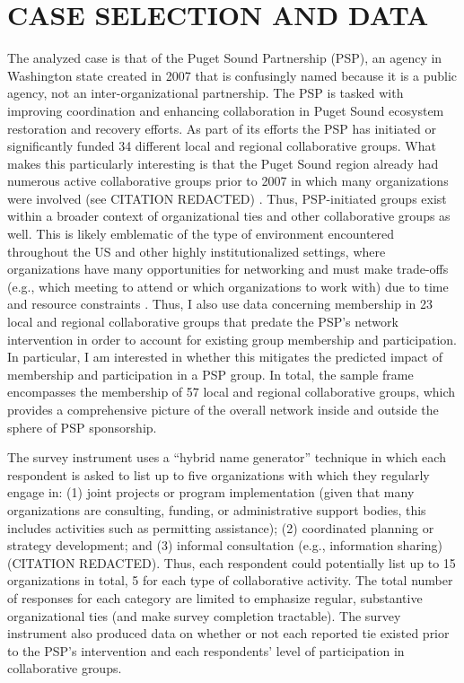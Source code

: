 \documentclass[12pt,a4paper,titlepage]{article}
\begin{document}
\section{\bf\MakeUppercase{Case Selection and Data}}

The analyzed case is that of the Puget Sound Partnership (PSP), an agency in Washington state created in 2007 that is confusingly named because it is a public agency, not an inter-organizational partnership. The PSP is tasked with improving coordination and enhancing collaboration in Puget Sound ecosystem restoration and recovery efforts. As part of its efforts the PSP has initiated or significantly funded 34 different local and regional collaborative groups. What makes this particularly interesting is that the Puget Sound region already had numerous active collaborative groups prior to 2007 in which many organizations were involved (see CITATION REDACTED) . Thus, PSP-initiated groups exist within a broader context of organizational ties and other collaborative groups as well. This is likely emblematic of the type of environment encountered throughout the US and other highly institutionalized settings, where organizations have many opportunities for networking and must make trade-offs (e.g., which meeting to attend or which organizations to work with) due to time and resource constraints \parencite{lubell2010}. Thus, I also use data concerning membership in 23 local and regional collaborative groups that predate the PSP’s network intervention in order to account for existing group membership and participation. In particular, I am interested in whether this mitigates the predicted impact of membership and participation in a PSP group. In total, the sample frame encompasses the membership of 57 local and regional collaborative groups, which provides a comprehensive picture of the overall network inside and outside the sphere of PSP sponsorship.

The survey instrument uses a “hybrid name generator” technique \parencite{henry2012,lubell2011-a} in which each respondent is asked to list up to five organizations with which they regularly engage in: (1) joint projects or program implementation (given that many organizations are consulting, funding, or administrative support bodies, this includes activities such as permitting assistance); (2) coordinated planning or strategy development; and (3) informal consultation (e.g., information sharing) (CITATION REDACTED). Thus, each respondent could potentially list up to 15 organizations in total, 5 for each type of collaborative activity. The total number of responses for each category are limited to emphasize regular, substantive organizational ties (and make survey completion tractable). The survey instrument also produced data on whether or not each reported tie existed prior to the PSP’s intervention and each respondents’ level of participation in collaborative groups.
\end{document}
